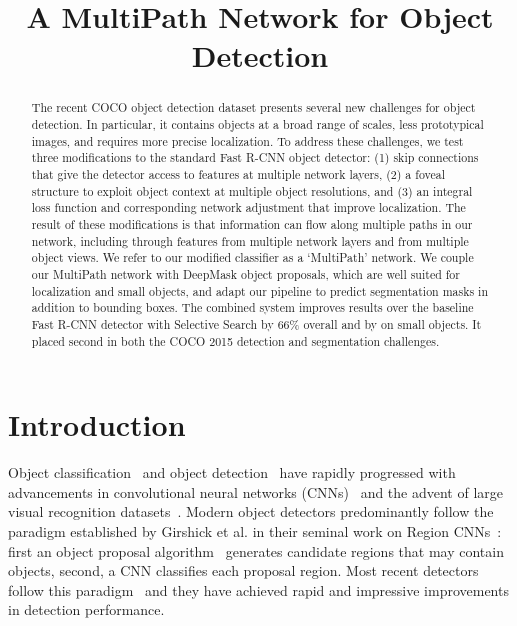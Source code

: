 \documentclass{bmvc2k}
\title{A MultiPath Network for Object Detection}
\begin{document}
\maketitle

\begin{abstract}
The recent COCO object detection dataset presents several new challenges for object detection. In particular, it contains objects at a broad range of scales, less prototypical images, and requires more precise localization. To address these challenges, we test three modifications to the standard Fast R-CNN object detector: (1) skip connections that give the detector access to features at multiple network layers, (2) a foveal structure to exploit object context at multiple object resolutions, and (3) an integral loss function and corresponding network adjustment that improve localization. The result of these modifications is that information can flow along multiple paths in our network, including through features from multiple network layers and from multiple object views. We refer to our modified classifier as a `MultiPath' network. We couple our MultiPath network with DeepMask object proposals, which are well suited for localization and small objects, and adapt our pipeline to predict segmentation masks in addition to bounding boxes. The combined system improves results over the baseline Fast R-CNN detector with Selective Search by 66\% overall and by  on small objects. It placed second in both the COCO 2015 detection and segmentation challenges.
\end{abstract}

\section{Introduction}

Object classification~\cite{AlexNet, Simonyan15, GoogLeNet} and object detection~\cite{SermanetICLR2013, Szegedy15, girshick15fastrcnn} have rapidly progressed with advancements in convolutional neural networks (CNNs)~\cite{lecun1998gradient} and the advent of large visual recognition datasets~\cite{Everingham10, imagenet_cvpr09, mscoco2015}. Modern object detectors predominantly follow the paradigm established by Girshick et al. in their seminal work on Region CNNs~\cite{Girshick2014rcnn}: first an object proposal algorithm~\cite{Hosang2015proposals} generates candidate regions that may contain objects, second, a CNN classifies each proposal region. Most recent detectors follow this paradigm~\cite{gidaris2015object, girshick15fastrcnn, RenNIPS15fasterRCNN} and they have achieved rapid and impressive improvements in detection performance.
\end{document}
